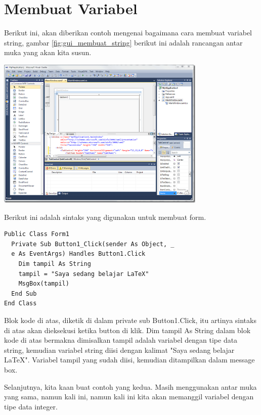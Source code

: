 \documentclass[oneside,listof=totoc]{scrbook}
\begin{document}
\section{Membuat Variabel}
Berikut ini, akan diberikan contoh mengenai bagaimana cara membuat variabel string, gambar \ref{fig:gui_membuat_string} berikut ini adalah rancangan antar muka yang akan kita susun.

\vspace{0.5cm}

\begin{minipage}{\linewidth}
  \centering
  \includegraphics[width=10cm]{figures/fig_gui_membuat_form}
  \label{fig:gui_membuat_string}
\end{minipage}

\vspace{0.5cm}

Berikut ini adalah sintaks yang digunakan untuk membuat form.

\begin{verbatim}
Public Class Form1
  Private Sub Button1_Click(sender As Object, _
  e As EventArgs) Handles Button1.Click
    Dim tampil As String
    tampil = "Saya sedang belajar LaTeX"
    MsgBox(tampil)
  End Sub
End Class
\end{verbatim}

Blok kode di atas, diketik di dalam private sub Button1.Click, itu artinya sintaks di atas akan dieksekusi ketika button di klik. Dim tampil As String dalam blok kode di atas bermakna dimisalkan tampil adalah variabel dengan tipe data string, kemudian variabel string diisi dengan kalimat "Saya sedang belajar LaTeX". Variabel tampil yang sudah diisi, kemudian ditampilkan dalam message box.

Selanjutnya, kita kaan buat contoh yang kedua. Masih menggunakan antar muka yang sama, namun kali ini, namun kali ini kita akan memanggil variabel dengan tipe data integer.
\end{document}
